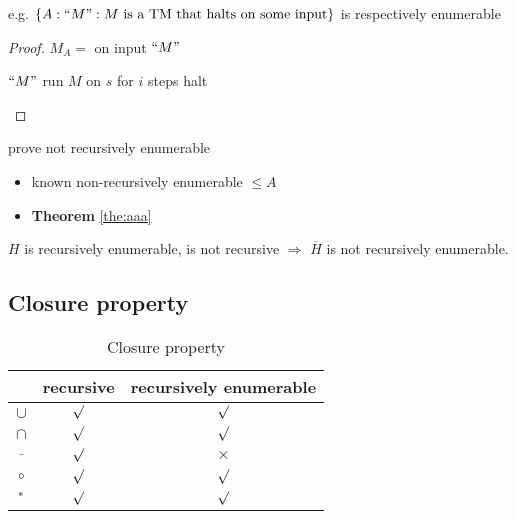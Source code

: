 e.g. $\{ A: {``M"}: M \text{ is a TM that halts on some input} \}$ is respectively enumerable
\begin{proof}
    $M_A=$ on input ${``M"}$
    \begin{algorithm}[H]
        \caption{$M_A$}
        \begin{algorithmic}
            \Require ${``M"}$
                    \State run $M$ on $s$ for $i$ steps
                        \State halt
                    \EndIf
                \EndFor
            \EndFor
        \end{algorithmic}
    \end{algorithm}
    
\end{proof}

prove not recursively enumerable
\begin{itemize}
    \item known non-recursively enumerable $\le A$
    \item \textbf{Theorem} \ref{the:aaa}
\end{itemize}

$H$ is recursively enumerable, is not recursive $\Rightarrow $ $\overline{H}$ is not recursively enumerable. 

\subsection{Closure property}
\begin{table}[!htb]
    \centering
    \caption{Closure property}
    \begin{tabular}[c]{ccc}\toprule
         &recursive & recursively enumerable \\ \midrule
        $\cup$ &  $\surd$ & $\surd$  \\
        $\cap$ &  $\surd$ & $\surd$ \\
        $\bar{}$ &$\surd$ & $\times$ \\
        $\circ$ & $\surd$ & $\surd$ \\
        ${}^*$ &  $\surd$ & $\surd$ \\
        \bottomrule
    \end{tabular}
\end{table}

